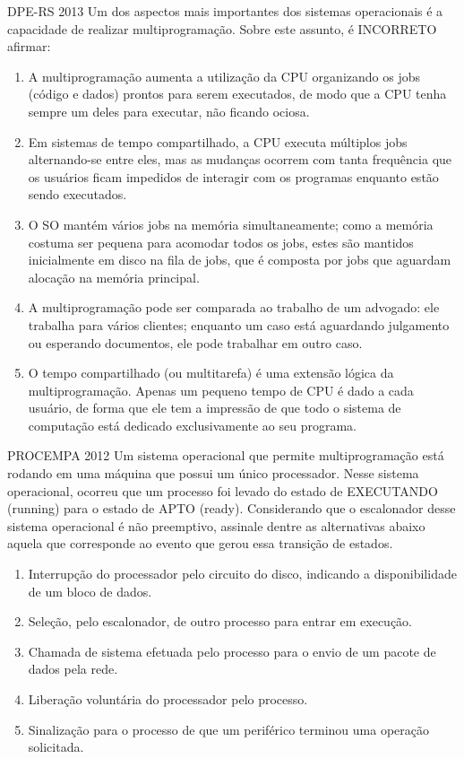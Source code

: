 \documentclass[aspectratio=169,
				xcolor=table]{beamer}
\begin{document}
	\begin{frame}{DPE-RS 2013}
		Um dos aspectos mais importantes dos sistemas operacionais é a capacidade de realizar multiprogramação. Sobre este assunto, é INCORRETO afirmar:
		\begin{enumerate}[a]
			\small
			\item A multiprogramação aumenta a utilização da CPU organizando os jobs (código e dados) prontos para serem executados, de modo que a CPU tenha sempre um deles para executar, não ficando ociosa.
			\item \alert{Em sistemas de tempo compartilhado, a CPU executa múltiplos jobs alternando-se entre eles, mas as mudanças ocorrem com tanta frequência que os usuários ficam impedidos de interagir com os programas enquanto estão sendo executados.}
			\item O SO mantém vários jobs na memória simultaneamente; como a memória costuma ser pequena para acomodar todos os jobs, estes são mantidos inicialmente em disco na fila de jobs, que é composta por jobs que aguardam alocação na memória principal.
			\item A multiprogramação pode ser comparada ao trabalho de um advogado: ele trabalha para vários clientes; enquanto um caso está aguardando julgamento ou esperando documentos, ele pode trabalhar em outro caso.
			\item O tempo compartilhado (ou multitarefa) é uma extensão lógica da multiprogramação. Apenas um pequeno tempo de CPU é dado a cada usuário, de forma que ele tem a impressão de que todo o sistema de computação está dedicado exclusivamente ao seu programa.
			
		\end{enumerate}

	\end{frame}	
	
	\begin{frame}{PROCEMPA 2012}
		Um sistema operacional que permite multiprogramação está rodando em uma máquina que possui um único processador. Nesse sistema operacional, ocorreu que um processo foi levado do estado de EXECUTANDO (running) para o estado de APTO (ready). Considerando que o escalonador desse sistema operacional é não preemptivo, assinale dentre as alternativas abaixo aquela que corresponde ao evento que gerou essa transição de estados.
		\begin{enumerate}[a]
			\item Interrupção do processador pelo circuito do disco, indicando a disponibilidade de um bloco de dados.
			\item Seleção, pelo escalonador, de outro processo para entrar em execução.
			\item Chamada de sistema efetuada pelo processo para o envio de um pacote de dados pela rede.
			\item Liberação voluntária do processador pelo processo.
			\item Sinalização para o processo de que um periférico terminou uma operação solicitada.
			
		\end{enumerate}
	\end{frame}	
	
\end{document}
